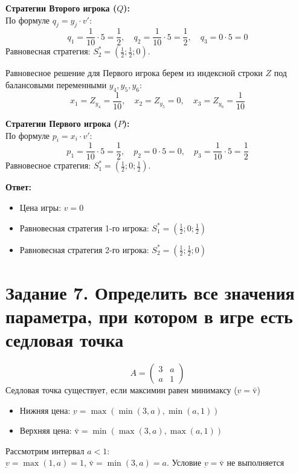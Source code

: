 \documentclass[a4paper,12pt]{article}
\begin{document}
\textbf{Стратегии Второго игрока ($Q$):}\\
По формуле $q_j = y_j \cdot v'$:
$$q_1 = \frac{1}{10} \cdot 5 = \frac{1}{2}, \quad q_2 = \frac{1}{10} \cdot 5 = \frac{1}{2}, \quad q_3 = 0 \cdot 5 = 0$$
Равновесная стратегия: $S_2^* = \left(\frac{1}{2}; \frac{1}{2}; 0\right)$.

\vspace{0.5cm}
Равновесное решение для Первого игрока берем из индексной строки $Z$ под балансовыми переменными $y_4, y_5, y_6$:
$$x_1 = Z_{y_4} = \frac{1}{10}, \quad x_2 = Z_{y_5} = 0, \quad x_3 = Z_{y_6} = \frac{1}{10}$$

\textbf{Стратегии Первого игрока ($P$):}\\
По формуле $p_i = x_i \cdot v'$:
$$p_1 = \frac{1}{10} \cdot 5 = \frac{1}{2}, \quad p_2 = 0 \cdot 5 = 0, \quad p_3 = \frac{1}{10} \cdot 5 = \frac{1}{2}$$
Равновесное стратегия: $S_1^* = \left(\frac{1}{2}; 0; \frac{1}{2}\right)$.

\vspace{0.5cm}
\textbf{Ответ:}
\begin{itemize}
    \item Цена игры: $v = 0$
    \item Равновесная стратегия 1-го игрока: $S_1^* = \left(\frac{1}{2}; 0; \frac{1}{2}\right)$
    \item Равновесная стратегия 2-го игрока: $S_2^* = \left(\frac{1}{2}; \frac{1}{2}; 0\right)$
\end{itemize}


\newpage


\section*{Задание 7. Определить все значения параметра, при котором в игре есть седловая точка}
$$A = \begin{pmatrix} 3 & a \\ a & 1 \end{pmatrix}$$
Седловая точка существует, если максимин равен минимаксу ($\underbar{v} = \bar{\text{v}}$)
\begin{itemize}
    \item Нижняя цена: $\underbar{v} = \max(\min(3, a), \min(a, 1))$
    \item Верхняя цена: $\bar{\text{v}} = \min(\max(3, a), \max(a, 1))$
\end{itemize}

Рассмотрим интервал $a < 1$: \\
$\underbar{v} = \max(1, a) = 1$, $\bar{\text{v}} = \min(3, a) = a$. Условие $\underbar{v} = \bar{\text{v}}$ не выполняется \\
\end{document}
